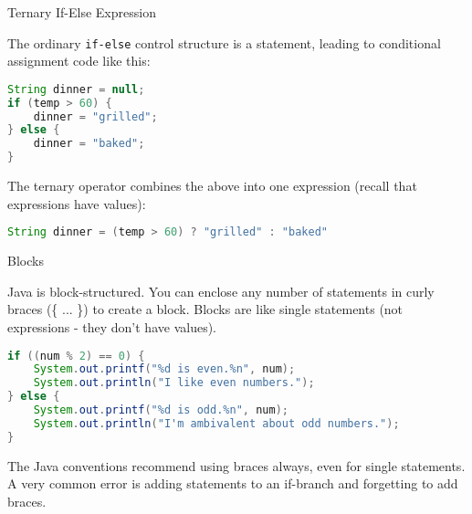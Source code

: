\documentclass{beamer}
\begin{document}
\begin{frame}[fragile]{Ternary If-Else Expression}


The ordinary {\tt if-else} control structure is a statement, leading
to conditional assignment code like this: 
\begin{lstlisting}[language=Java]
String dinner = null;
if (temp > 60) {
    dinner = "grilled";
} else {
    dinner = "baked";
}
\end{lstlisting}

The ternary operator combines the above into one expression (recall
that expressions have values):

\begin{lstlisting}[language=Java]
String dinner = (temp > 60) ? "grilled" : "baked" 
\end{lstlisting}

\end{frame}


\begin{frame}[fragile]{Blocks}


Java is block-structured.  You can enclose any number
of statements in curly braces (\{ ... \}) to create a block.  Blocks
are like single statements (not expressions - they don't have values).
\begin{lstlisting}[language=Java]
if ((num % 2) == 0) {
    System.out.printf("%d is even.%n", num);
    System.out.println("I like even numbers.");
} else {
    System.out.printf("%d is odd.%n", num);
    System.out.println("I'm ambivalent about odd numbers.");
}
\end{lstlisting}
The Java conventions recommend using braces always, even for single
statements.  A very common error is adding statements to an if-branch
and forgetting to add braces.

\end{frame}
\end{document}
